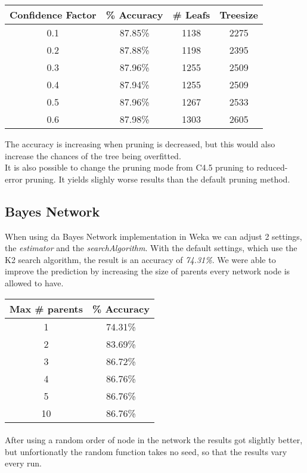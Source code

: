 \documentclass{article}
\begin{document}
\begin{center}
\begin{tabular}{ c | c | c | c}
\textbf{Confidence Factor} & \textbf{\% Accuracy} & \textbf{\# Leafs} & \textbf{Treesize}\\
\hline
0.1 & 87.85\% & 1138 & 2275\\
0.2 & 87.88\% & 1198 & 2395\\
0.3 & 87.96\% & 1255 & 2509\\
0.4 & 87.94\% & 1255 & 2509\\
0.5 & 87.96\% & 1267 & 2533\\
0.6 & 87.98\% & 1303 & 2605\\
\end{tabular}
\end{center}

The accuracy is increasing when pruning is decreased, but this would also increase the chances of the tree being overfitted.\\
It is also possible to change the pruning mode from C4.5 pruning to reduced-error pruning. It yields slighly worse results than the default pruning method.


\subsection{Bayes Network}
When using da Bayes Network implementation in Weka we can adjust 2 settings, the \emph{estimator} and the \emph{searchAlgorithm}. With the default settings, which use the K2 search algorithm, the result is an accuracy of \emph{74.31\%}. We were able to improve the prediction by increasing the size of parents every network node is allowed to have.

\begin{center}
\begin{tabular}{ c | c }
\textbf{Max \# parents} & \textbf{\% Accuracy} \\
\hline
1  & 74.31\% \\
2  & 83.69\% \\
3  & 86.72\% \\
4  & 86.76\% \\
5  & 86.76\% \\
10 & 86.76\% \\
\end{tabular}
\end{center}

\paragraph{}After using a random order of node in the network the results got slightly better, but unfortionatly the random function takes no seed, so that the results vary every run.
\end{document}

